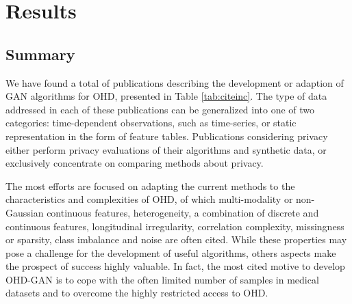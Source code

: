 \section{Results}
    \subsection{Summary}
        We have found a total of \todo publications describing the development or adaption of GAN algorithms for OHD, presented in Table \ref{tab:citeinc}. The type of data addressed in each of these publications can be generalized into one of two categories: time-dependent observations, such as time-series, or static representation in the form of feature tables. Publications considering privacy either perform privacy evaluations of their algorithms and synthetic data, or exclusively concentrate on comparing methods about privacy.
        
        \todo%
        \todo%
        
        The most efforts are focused on adapting the current methods to the characteristics and complexities of OHD, of which multi-modality or non-Gaussian continuous features, heterogeneity, a combination of discrete and continuous features, longitudinal irregularity, correlation complexity, missingness or sparsity, class imbalance and noise are often cited. While these properties may pose a challenge for the development of useful algorithms, others aspects make the prospect of success highly valuable. In fact, the most cited motive to develop OHD-GAN is to cope with the often limited number of samples in medical datasets and to overcome the highly restricted access to OHD.\par
        
        
        
        
        
        
        
        
        
        
        
        
       



